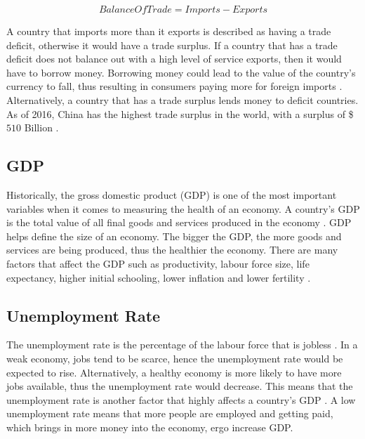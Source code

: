 \documentclass{UoYCSproject}
\begin{document}
\begin{equation}
    Balance Of Trade = Imports - Exports
\end{equation}

A country that imports more than it exports is described as having a trade deficit, otherwise it would have a trade surplus. If a country that has a trade deficit does not balance out with a high level of service exports, then it would have to borrow money. Borrowing money could lead to the value of the country's currency to fall, thus resulting in consumers paying more for foreign imports \cite{2003economics}. Alternatively, a country that has a trade surplus lends money to deficit countries. As of 2016, China has the highest trade surplus in the world, with a surplus of \$$510$ Billion \cite{tradesurplus}.   

\subsection{GDP}
Historically, the gross domestic product (GDP) is one of the most important variables when it comes to measuring the health of an economy. A country's GDP is the total value of all final goods and services produced in the economy \cite{2003economics}. GDP helps define the size of an economy. The bigger the GDP, the more goods and services are being produced, thus the healthier the economy.  There are many factors that affect the GDP such as productivity, labour force size, life expectancy, higher initial schooling, lower inflation and lower fertility \cite{barro1996determinants}. 

\subsection{Unemployment Rate}
The unemployment rate is the percentage of the labour force that is jobless \cite{unemployment}. In a weak economy, jobs tend to be scarce, hence the unemployment rate would be expected to rise. Alternatively, a healthy economy is more likely to have more jobs available, thus the unemployment rate would decrease. This means that the unemployment rate is another factor that highly affects a country's GDP \cite{bean1993unemployment}. A low unemployment rate means that more people are employed and getting paid, which brings in more money into the economy, ergo increase GDP.  
\end{document}
